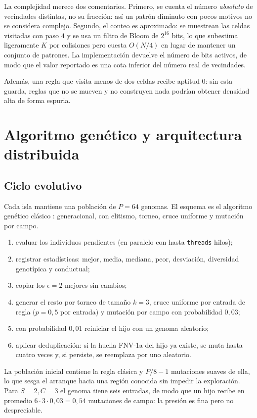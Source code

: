 \documentclass[11pt,a4paper]{article}
\begin{document}
La complejidad merece dos comentarios.  Primero, se cuenta el n\'umero
\emph{absoluto} de vecindades distintas, no su fracci\'on: as\'i un patr\'on
diminuto con pocos motivos no se considera complejo.  Segundo, el conteo es
aproximado: se muestrean las celdas visitadas con paso $4$ y se usa un filtro de
Bloom de $2^{16}$ bits, lo que subestima ligeramente $K$ por colisiones pero
cuesta $O(N/4)$ en lugar de mantener un conjunto de patrones.  La
implementaci\'on devuelve el n\'umero de bits activos, de modo que el valor
reportado es una cota inferior del n\'umero real de vecindades.

Adem\'as, una regla que visita menos de dos celdas recibe aptitud $0$: sin esta
guarda, reglas que no se mueven y no construyen nada podr\'ian obtener densidad
alta de forma espuria.

\section{Algoritmo gen\'etico y arquitectura distribuida}\label{sec:ga}

\subsection{Ciclo evolutivo}

Cada isla mantiene una poblaci\'on de $P=64$ genomas.  El esquema es el
algoritmo gen\'etico cl\'asico \citep{holland1975,goldberg1989,whitley1994}:
generacional, con elitismo, torneo, cruce uniforme y mutaci\'on por campo.
\begin{enumerate}
  \item evaluar los individuos pendientes (en paralelo con hasta
        \texttt{threads} hilos);
  \item registrar estad\'isticas: mejor, media, mediana, peor, desviaci\'on,
        diversidad genot\'ipica y conductual;
  \item copiar los $\epsilon=2$ mejores sin cambios;
  \item generar el resto por torneo de tama\~no $k=3$, cruce uniforme por
        entrada de regla ($p=0{,}5$ por entrada) y mutaci\'on por campo con
        probabilidad $0{,}03$;
  \item con probabilidad $0{,}01$ reiniciar el hijo con un genoma aleatorio;
  \item aplicar deduplicaci\'on: si la huella FNV-1a del hijo ya existe, se
        muta hasta cuatro veces y, si persiste, se reemplaza por uno aleatorio.
\end{enumerate}
La poblaci\'on inicial contiene la regla cl\'asica y $P/8-1$ mutaciones suaves
de ella, lo que sesga el arranque hacia una regi\'on conocida sin impedir la
exploraci\'on.  Para $S=2,C=3$ el genoma tiene seis entradas, de modo que un
hijo recibe en promedio $6\cdot3\cdot0{,}03=0{,}54$ mutaciones de campo: la
presi\'on es fina pero no despreciable.
\end{document}
